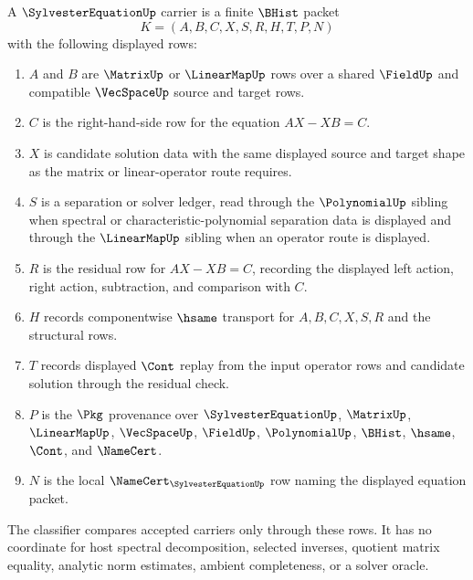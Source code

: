 \begin{definition}
\label{def:sylvester-equation-carrier}
A $\SylvesterEquationUp$ carrier is a finite $\BHist$ packet
$$
K=(A,B,C,X,S,R,H,T,P,N)
$$
with the following displayed rows:
\begin{enumerate}
\item $A$ and $B$ are $\MatrixUp$ or $\LinearMapUp$ rows over a shared $\FieldUp$ and compatible $\VecSpaceUp$ source and target rows.
\item $C$ is the right-hand-side row for the equation $AX-XB=C$.
\item $X$ is candidate solution data with the same displayed source and target shape as the matrix or linear-operator route requires.
\item $S$ is a separation or solver ledger, read through the $\PolynomialUp$ sibling when spectral or characteristic-polynomial separation data is displayed and through the $\LinearMapUp$ sibling when an operator route is displayed.
\item $R$ is the residual row for $AX-XB=C$, recording the displayed left action, right action, subtraction, and comparison with $C$.
\item $H$ records componentwise $\hsame$ transport for $A,B,C,X,S,R$ and the structural rows.
\item $T$ records displayed $\Cont$ replay from the input operator rows and candidate solution through the residual check.
\item $P$ is the $\Pkg$ provenance over $\SylvesterEquationUp$, $\MatrixUp$, $\LinearMapUp$, $\VecSpaceUp$, $\FieldUp$, $\PolynomialUp$, $\BHist$, $\hsame$, $\Cont$, and $\NameCert$.
\item $N$ is the local $\NameCert_{\SylvesterEquationUp}$ row naming the displayed equation packet.
\end{enumerate}
The classifier compares accepted carriers only through these rows. It has no coordinate for host spectral decomposition, selected inverses, quotient matrix equality, analytic norm estimates, ambient completeness, or a solver oracle.
\end{definition}

